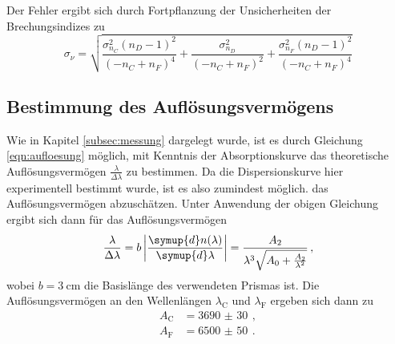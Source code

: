 Der Fehler ergibt sich durch Fortpflanzung der Unsicherheiten der Brechungsindizes zu
\begin{equation*}
  \sigma_{\nu}= \sqrt{\frac{\sigma_{n_C}^{2} \left(n_D - 1\right)^{2}}{\left(- n_C + n_F\right)^{4}}
  + \frac{\sigma_{n_D}^{2}}{\left(- n_C + n_F\right)^{2}} + \frac{\sigma_{n_F}^{2} \left(n_D - 1\right)^{2}}{\left(- n_C + n_F\right)^{4}}}
\end{equation*}

\subsection{Bestimmung des Auflösungsvermögens}
\label{subsec:auflösung}
Wie in Kapitel \ref{subsec:messung} dargelegt wurde, ist es durch Gleichung \eqref{eqn:aufloesung} möglich,
mit Kenntnis der Absorptionskurve das theoretische Auflösungsvermögen $\frac{\lambda}{\Delta \lambda}$ zu bestimmen.
Da die Dispersionskurve hier experimentell bestimmt wurde, ist es also zumindest möglich.
das Auflösungsvermögen abzuschätzen. Unter Anwendung der obigen Gleichung ergibt sich dann
für das Auflösungsvermögen
\begin{equation}
  \frac{\lambda}{\Delta \lambda} = b \left|\frac{\symup{d}n(\lambda)}{\symup{d}\lambda}\right| = \frac{A_2}{\lambda^3\sqrt{A_0 + \frac{A_2}{\lambda^2}}}\,,
\end{equation}
wobei $b = \SI{3}{\centi\meter}$ die Basislänge des verwendeten Prismas ist.
Die Auflösungsvermögen an den Wellenlängen $\lambda_\text{C}$ und $\lambda_\text{F}$
ergeben sich dann zu
\begin{align*}
  A_\text{C} &= \SI{3690(30)}{}\,, \\
  A_\text{F} &= \SI{6500(50)}{}\,. \\
\end{align*}
